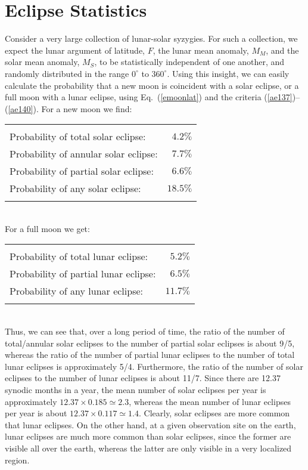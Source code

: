 \section{Eclipse Statistics}
Consider a very large collection of lunar-solar syzygies. For such a collection,
we expect the lunar argument of latitude, $F$, the lunar mean anomaly, $M_M$,
and the solar mean anomaly, $M_S$, to be statistically independent of one another, and randomly distributed in
the range $0^\circ$ to $360^\circ$. Using this
insight, we can easily calculate the probability that a new moon is coincident with a
solar eclipse, or a full moon with a lunar eclipse, using Eq.~(\ref{emoonlat})
and the criteria (\ref{ae137})--(\ref{ae140}).
For a new moon we find:\\
\begin{tabular}{lr}
&\\
Probability of total solar eclipse: &$4.2\%$\\
Probability of annular solar eclipse: &$7.7\%$\\
Probability of partial solar eclipse: &$6.6\%$\\
Probability of any solar eclipse:&$18.5\%$\\
&\\
\end{tabular}\\
 For a full moon we get:\\
\begin{tabular}{lr}
&\\
Probability of total lunar eclipse:& $5.2\%$\\
Probability of partial lunar eclipse: & $6.5\%$\\
Probability of any lunar eclipse:&$11.7\%$\\
&\\
\end{tabular}\\
Thus, we can see that, over a long  period of time, the ratio of the number of total/annular solar eclipses to the number of partial solar
eclipses is about 9/5, whereas the ratio of the number of partial 
lunar eclipses to the number of total lunar eclipses is approximately 5/4. Furthermore,
the ratio of the number of solar eclipses to the number of lunar eclipses
is about 11/7. Since there are 12.37 synodic months in a year, the
mean number of solar eclipses per year is approximately $12.37\times 0.185\simeq 2.3$,
whereas the mean number of lunar eclipses per year is about $12.37\times 0.117\simeq 1.4$. Clearly, solar eclipses are more  common that lunar
eclipses. On the other hand, at a given observation site on the earth, lunar eclipses
are much more common than solar eclipses, since the former are visible
all over the earth, whereas the latter are only visible in a very localized
region.

